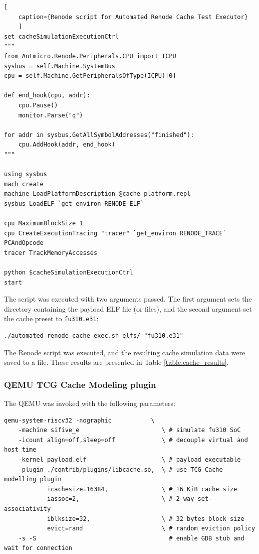 \begin{center}
\centering
\begin{minipage}{\linewidth}
\begin{lstlisting}[
    caption={Renode script for Automated Renode Cache Test Executor}
    ]
set cacheSimulationExecutionCtrl
"""
from Antmicro.Renode.Peripherals.CPU import ICPU
sysbus = self.Machine.SystemBus
cpu = self.Machine.GetPeripheralsOfType(ICPU)[0]

def end_hook(cpu, addr):
    cpu.Pause()
    monitor.Parse("q")

for addr in sysbus.GetAllSymbolAddresses("finished"):
    cpu.AddHook(addr, end_hook)
"""

using sysbus
mach create
machine LoadPlatformDescription @cache_platform.repl
sysbus LoadELF `get_environ RENODE_ELF`

cpu MaximumBlockSize 1
cpu CreateExecutionTracing "tracer" `get_environ RENODE_TRACE` PCAndOpcode
tracer TrackMemoryAccesses

python $cacheSimulationExecutionCtrl
start
\end{lstlisting}
\end{minipage}
\end{center}

\noindent The script was executed with two arguments passed. The first argument sets the directory containing the payload ELF file (or files), and the second argument set the cache preset to \texttt{fu310.e31}:
\begin{verbatim}
./automated_renode_cache_exec.sh elfs/ "fu310.e31"
\end{verbatim}

\noindent The Renode script was executed, and the resulting cache simulation data were saved to a file. These results are presented in Table \ref{table:cache_results}.

\subsubsection{QEMU TCG Cache Modeling plugin}
The QEMU was invoked with the following parameters:
\begin{verbatim}
qemu-system-riscv32 -nographic           \
	-machine sifive_e                       \ # simulate fu310 SoC
	-icount align=off,sleep=off             \ # decouple virtual and host time
	-kernel payload.elf                     \ # payload executable
	-plugin ./contrib/plugins/libcache.so,  \ # use TCG Cache modelling plugin
	        icachesize=16384,               \ # 16 KiB cache size
	        iassoc=2,                       \ # 2-way set-associativity
	        iblksize=32,                    \ # 32 bytes block size
	        evict=rand                      \ # random eviction policy
	-s -S                                     # enable GDB stub and wait for connection
\end{verbatim}

